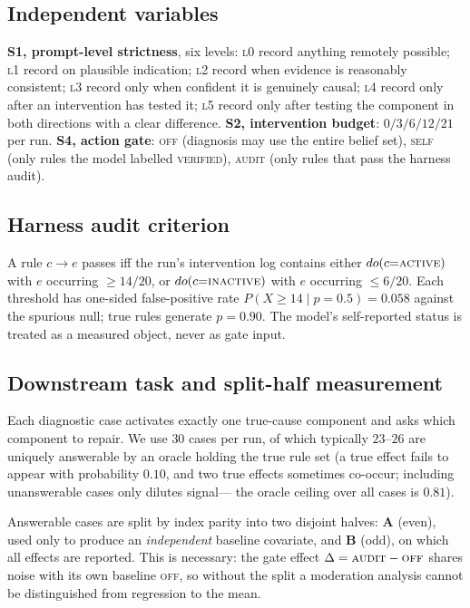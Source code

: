 \documentclass[11pt]{article}
\begin{document}
\subsection{Independent variables}
\textbf{S1, prompt-level strictness}, six levels: \textsc{l0} record anything remotely
possible; \textsc{l1} record on plausible indication; \textsc{l2} record when evidence is
reasonably consistent; \textsc{l3} record only when confident it is genuinely causal;
\textsc{l4} record only after an intervention has tested it; \textsc{l5} record only after
testing the component in both directions with a clear difference.
\textbf{S2, intervention budget}: $0/3/6/12/21$ per run.
\textbf{S4, action gate}: \textsc{off} (diagnosis may use the entire belief set),
\textsc{self} (only rules the model labelled \textsc{verified}), \textsc{audit} (only rules
that pass the harness audit).

\subsection{Harness audit criterion}
A rule $c\rightarrow e$ passes iff the run's intervention log contains either
$do(c{=}\textsc{active})$ with $e$ occurring $\geq 14/20$, or $do(c{=}\textsc{inactive})$
with $e$ occurring $\leq 6/20$. Each threshold has one-sided false-positive rate
$P(X\geq 14\mid p{=}0.5)=0.058$ against the spurious null; true rules generate $p{=}0.90$.
The model's self-reported status is treated as a measured object, never as gate input.

\subsection{Downstream task and split-half measurement}
Each diagnostic case activates exactly one true-cause component and asks which component to
repair. We use $30$ cases per run, of which typically $23$--$26$ are uniquely answerable by
an oracle holding the true rule set (a true effect fails to appear with probability $0.10$,
and two true effects sometimes co-occur; including unanswerable cases only dilutes signal---
the oracle ceiling over all cases is $0.81$).

Answerable cases are split by index parity into two disjoint halves: \textbf{A} (even),
used only to produce an \emph{independent} baseline covariate, and \textbf{B} (odd), on
which all effects are reported. This is necessary: the gate effect
$\Delta=\textsc{audit}-\textsc{off}$ shares noise with its own baseline \textsc{off}, so
without the split a moderation analysis cannot be distinguished from regression to the mean.
\end{document}
